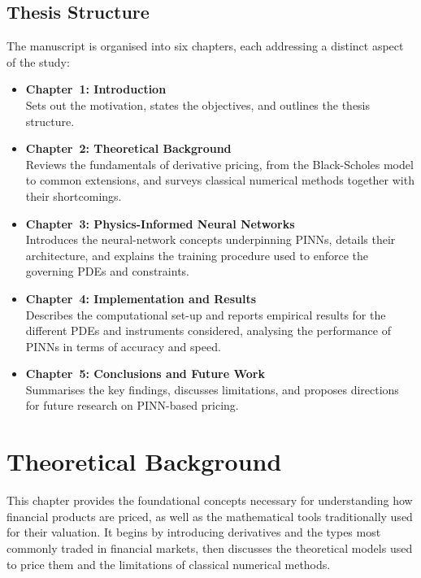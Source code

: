 \documentclass[12pt]{report} %
\theoremstyle{plain}           %
\theoremstyle{definition}      %
\theoremstyle{remark}          %
\begin{document}
\section{Thesis Structure}

The manuscript is organised into six chapters, each addressing a distinct aspect of the study:
\begin{itemize}
  \item \textbf{Chapter~1: Introduction} \\[2pt]
        Sets out the motivation, states the objectives, and outlines the thesis structure.

  \item \textbf{Chapter~2: Theoretical Background} \\[2pt]
        Reviews the fundamentals of derivative pricing, from the Black-Scholes model to common
        extensions, and surveys classical numerical methods together with their shortcomings.

  \item \textbf{Chapter~3: Physics-Informed Neural Networks} \\[2pt]
        Introduces the neural-network concepts underpinning PINNs, details their architecture,
        and explains the training procedure used to enforce the governing PDEs and constraints.

  \item \textbf{Chapter~4: Implementation and Results} \\[2pt]
        Describes the computational set-up and reports empirical results for the different PDEs
        and instruments considered, analysing the performance of PINNs in terms of accuracy and
        speed.

  \item \textbf{Chapter~5: Conclusions and Future Work} \\[2pt]
        Summarises the key findings, discusses limitations, and proposes directions for future
        research on PINN-based pricing.
\end{itemize}

\chapter{Theoretical Background}
This chapter provides the foundational concepts necessary for understanding how financial products
are priced, as well as the mathematical tools traditionally used for their valuation. It begins by
introducing derivatives and the types most commonly traded in financial markets, then discusses the
theoretical models used to price them and the limitations of classical numerical methods.
\end{document}

